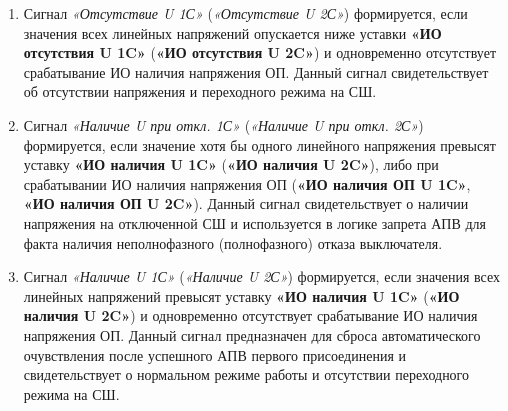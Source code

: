 \begin{enumerate}
\item
Сигнал \textit{«Отсутствие U 1С»} (\textit{«Отсутствие U 2С»}) формируется, если значения всех линейных напряжений опускается ниже уставки \textbf{«ИО отсутствия U 1C»} (\textbf{«ИО отсутствия U 2C»}) и одновременно отсутствует срабатывание ИО наличия напряжения ОП. Данный сигнал свидетельствует об отсутствии напряжения и переходного режима на СШ.

\item
Сигнал \textit{«Наличие U при откл. 1С»} (\textit{«Наличие U при откл. 2С»}) формируется, если значение хотя бы одного линейного напряжения превысят уставку \textbf{«ИО наличия U 1C»} (\textbf{«ИО наличия U 2C»}), либо при срабатывании ИО наличия напряжения ОП (\textbf{«ИО наличия ОП U 1C»}, \textbf{«ИО наличия ОП U 2C»}). Данный сигнал свидетельствует о наличии напряжения на отключенной СШ и используется в логике запрета АПВ для факта наличия неполнофазного (полнофазного) отказа выключателя.

\item
Сигнал \textit{«Наличие U 1С»} (\textit{«Наличие U 2С»}) формируется, если значения всех линейных напряжений превысят уставку \textbf{«ИО наличия U 1C»} (\textbf{«ИО наличия U 2C»}) и одновременно отсутствует срабатывание ИО наличия напряжения ОП. Данный сигнал предназначен для сброса автоматического очувствления после успешного АПВ первого присоединения и свидетельствует о нормальном режиме работы и отсутствии переходного режима на СШ.

\end{enumerate}


